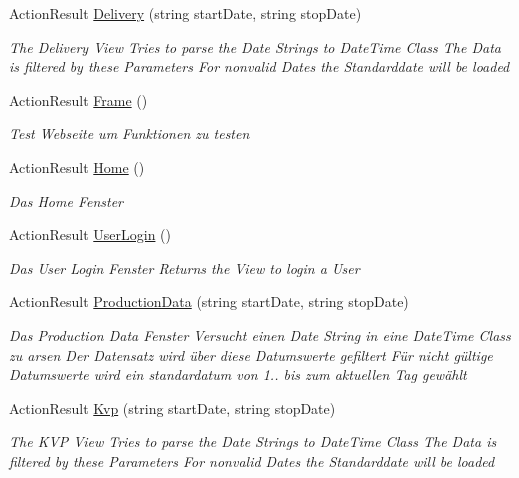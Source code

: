 \begin{DoxyCompactItemize}
Action\+Result \hyperlink{classkpi_mvc_api_1_1_controllers_1_1_home_controller_a0fe5ac7be69616c8f56e8938e042cc27}{Delivery} (string start\+Date, string stop\+Date)
\begin{DoxyCompactList}\small\item\em The Delivery View Tries to parse the Date Strings to Date\+Time Class The Data is filtered by these Parameters For nonvalid Dates the Standarddate will be loaded \end{DoxyCompactList}\item 
Action\+Result \hyperlink{classkpi_mvc_api_1_1_controllers_1_1_home_controller_a8fe51f06ec9db44e1766f89691af44f6}{Frame} ()
\begin{DoxyCompactList}\small\item\em Test Webseite um Funktionen zu testen \end{DoxyCompactList}\item 
Action\+Result \hyperlink{classkpi_mvc_api_1_1_controllers_1_1_home_controller_a71cc0c383f8e44677455f0caf590e0a7}{Home} ()
\begin{DoxyCompactList}\small\item\em Das Home Fenster \end{DoxyCompactList}\item 
Action\+Result \hyperlink{classkpi_mvc_api_1_1_controllers_1_1_home_controller_a52ba84d65a16f3ec9f7c18ef46313b23}{User\+Login} ()
\begin{DoxyCompactList}\small\item\em Das User Login Fenster Returns the View to login a User \end{DoxyCompactList}\item 
Action\+Result \hyperlink{classkpi_mvc_api_1_1_controllers_1_1_home_controller_ae5c2fcc4413eda2cab2775cd9819efca}{Production\+Data} (string start\+Date, string stop\+Date)
\begin{DoxyCompactList}\small\item\em Das Production Data Fenster Versucht einen Date String in eine Date\+Time Class zu arsen Der Datensatz wird über diese Datumswerte gefiltert Für nicht gültige Datumswerte wird ein standardatum von 1.. bis zum aktuellen Tag gewählt \end{DoxyCompactList}\item 
Action\+Result \hyperlink{classkpi_mvc_api_1_1_controllers_1_1_home_controller_aab951608121b90d9424bb58c68bd0b23}{Kvp} (string start\+Date, string stop\+Date)
\begin{DoxyCompactList}\small\item\em The K\+VP View Tries to parse the Date Strings to Date\+Time Class The Data is filtered by these Parameters For nonvalid Dates the Standarddate will be loaded \end{DoxyCompactList}\item 

\end{DoxyCompactItemize}
